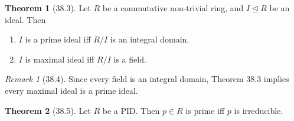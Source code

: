 \documentclass{article}
\theoremstyle{definition}
\newtheorem*{thm}{Theorem}
\theoremstyle{remark}
\newtheorem*{rmk}{Remark}
\newcommand{\ideal}{\unlhd}
\begin{document}
{    \begin{thm}[38.3]
        Let $R$ be a commutative non-trivial ring, and $I \ideal R$ be an ideal. Then
        \begin{enumerate}
            \item $I$ is a prime ideal iff $R/I$ is an integral domain.
            \item $I$ is maximal ideal iff $R/I$ is a field.
        \end{enumerate}
    \end{thm}
    
    \begin{rmk}[38.4]
        Since every field is an integral domain, Theorem 38.3 implies every maximal ideal is a prime ideal.
    \end{rmk}
    
    \begin{thm}[38.5]
        Let $R$ be a PID. Then $p \in R$ is prime iff $p$ is irreducible.
    \end{thm}
    
    }
\end{document}
